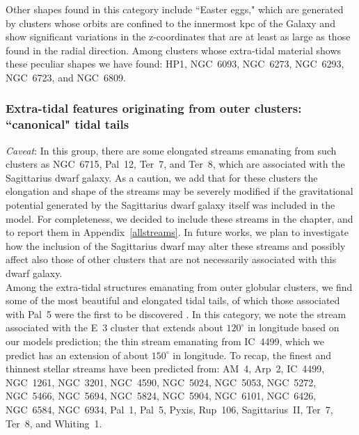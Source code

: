             Other shapes found in this category include ``Easter eggs," which are generated by clusters whose orbits are confined to the innermost kpc of the Galaxy and show significant variations in the z-coordinates that are at least as large as those found in the radial direction. Among clusters whose extra-tidal material shows these peculiar shapes we have found: HP1, NGC~6093, NGC~6273, NGC~6293, NGC~6723, and NGC~6809.

        \subsubsection{Extra-tidal features originating from outer clusters: ``canonical" tidal tails}

            \textit{Caveat}: In this group, there are some elongated streams emanating from such clusters as NGC~6715, Pal~12, Ter~7, and Ter~8, which are  associated with the Sagittarius dwarf galaxy. As a caution, we add that for these clusters the elongation and shape of the streams may be severely modified if the gravitational potential generated by the Sagittarius dwarf galaxy itself was included in the model. For completeness, we decided to include these streams in the chapter, and to report them in Appendix~\ref{allstreams}. In future works, we plan to investigate how the inclusion of the Sagittarius dwarf may alter these streams and possibly affect also those of other clusters that are not necessarily associated with this dwarf galaxy.\\

            Among the extra-tidal structures emanating from outer globular clusters, we find some of the most beautiful and elongated tidal tails, of which those associated with Pal~5 were the first to be discovered \citep{2001ApJ...548L.165O}.  In this category, we note the stream associated with the E~3 cluster that extends about  $120^\circ$  in longitude based on our models prediction; the thin stream emanating from IC~4499, which we predict has an extension of about $150^\circ$ in longitude.  To recap, the finest and thinnest stellar streams have been predicted from: AM~4, Arp~2, IC~4499, NGC~1261, NGC~3201, NGC~4590, NGC~5024, NGC~5053, NGC~5272, NGC~5466, NGC~5694, NGC~5824, NGC~5904, NGC~6101, NGC~6426, NGC~6584, NGC~6934, Pal~1, Pal~5, Pyxis, Rup~106, Sagittarius~II, Ter~7, Ter~8, and Whiting~1.

